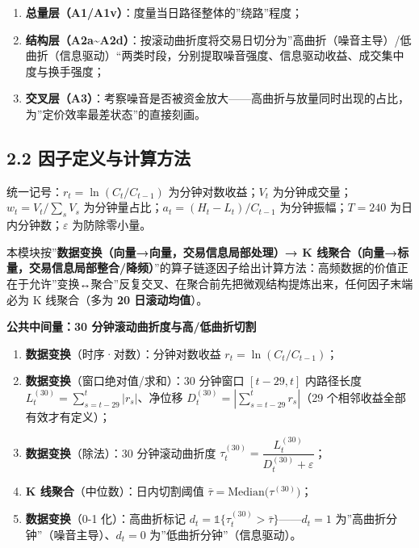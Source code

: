 \documentclass[UTF8,a4paper,zihao=-4,fontset=windows]{ctexart}
\providecommand{\tightlist}{\setlength{\itemsep}{0pt}\setlength{\parskip}{0pt}}
\begin{document}
\begin{enumerate}
\def\labelenumi{\arabic{enumi}.}
\tightlist
\item
  \textbf{总量层（A1/A1v）}：度量当日路径整体的''绕路''程度；
\item
  \textbf{结构层（A2a\textasciitilde A2d）}：按滚动曲折度将交易日切分为''高曲折（噪音主导）/低曲折（信息驱动）``两类时段，分别提取噪音强度、信息驱动收益、成交集中度与换手强度；
\item
  \textbf{交叉层（A3）}：考察噪音是否被资金放大------高曲折与放量同时出现的占比，为''定价效率最差状态''的直接刻画。
\end{enumerate}

\subsection{2.2
因子定义与计算方法}\label{ux56e0ux5b50ux5b9aux4e49ux4e0eux8ba1ux7b97ux65b9ux6cd5}

统一记号：\(r_t=\ln(C_t/C_{t-1})\) 为分钟对数收益；\(V_t\)
为分钟成交量；\(w_t=V_t/\sum_s V_s\)
为分钟量占比；\(a_t=(H_t-L_t)/C_{t-1}\) 为分钟振幅；\(T=240\)
为日内分钟数；\(\varepsilon\) 为防除零小量。

本模块按''\textbf{数据变换（向量→向量，交易信息局部处理）→ K
线聚合（向量→标量，交易信息局部整合/降频）}''的算子链逐因子给出计算方法：高频数据的价值正在于允许''变换↔聚合''反复交叉、在聚合前先把微观结构提炼出来，任何因子末端必为
K 线聚合（多为 \textbf{20 日滚动均值}）。

\textbf{公共中间量：30 分钟滚动曲折度与高/低曲折切割}

\begin{enumerate}
\def\labelenumi{\arabic{enumi}.}
\tightlist
\item
  \textbf{数据变换}（时序·对数）：分钟对数收益
  \(r_t=\ln(C_t/C_{t-1})\)；
\item
  \textbf{数据变换}（窗口绝对值/求和）：30 分钟窗口 \([t-29,t]\)
  内路径长度 \(L^{(30)}_t=\sum_{s=t-29}^{t}|r_s|\)、净位移
  \(D^{(30)}_t=\left|\sum_{s=t-29}^{t}r_s\right|\)（29
  个相邻收益全部有效才有定义）；
\item
  \textbf{数据变换}（除法）：30 分钟滚动曲折度
  \(\tau^{(30)}_t=\dfrac{L^{(30)}_t}{D^{(30)}_t+\varepsilon}\)；
\item
  \textbf{K 线聚合}（中位数）：日内切割阈值
  \(\bar\tau=\mathrm{Median}\big(\tau^{(30)}\big)\)；
\item
  \textbf{数据变换}（0-1 化）：高曲折标记
  \(d_t=\mathbb{1}\{\tau^{(30)}_t>\bar\tau\}\)------\(d_t=1\)
  为''高曲折分钟''（噪音主导）、\(d_t=0\) 为''低曲折分钟''（信息驱动）。
\end{enumerate}
\end{document}
